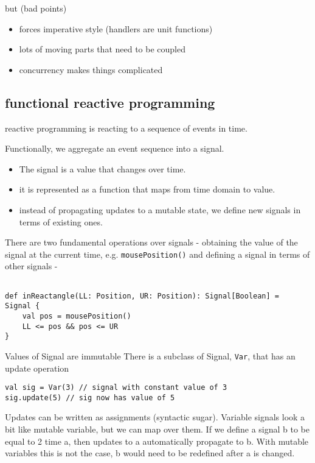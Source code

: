 but (bad points)
\begin{itemize}
	\item forces imperative style (handlers are unit functions)
	\item lots of moving parts that need to be coupled
	\item concurrency makes things complicated
\end{itemize}

\subsection{functional reactive programming}
reactive programming is reacting to a sequence of events in time.

Functionally, we aggregate an event sequence into a signal.
\begin{itemize}
	\item The signal is a value that changes over time.
	\item it is represented as a function that maps from time domain to value.
	\item instead of propagating updates to a mutable state, we define new signals in terms of existing ones.
\end{itemize}

There are two fundamental operations over signals - obtaining the value of the signal at the current time, e.g. \lstinline|mousePosition()| and defining a signal in terms of other signals -
\begin{lstlisting}

def inReactangle(LL: Position, UR: Position): Signal[Boolean] = 
Signal {
	val pos = mousePosition()
	LL <= pos && pos <= UR
}
\end{lstlisting}

Values of Signal are immutable
There is a subclass of Signal, \lstinline|Var|, that has an update operation
\begin{lstlisting}
val sig = Var(3) // signal with constant value of 3
sig.update(5) // sig now has value of 5
\end{lstlisting}

Updates can be written as assignments (syntactic sugar).
Variable signals look a bit like mutable variable, but we can map over them. If we define a signal b to be equal to 2 time a, then updates to a automatically propagate to b. With mutable variables this is not the case, b would need to be redefined after a is changed.

